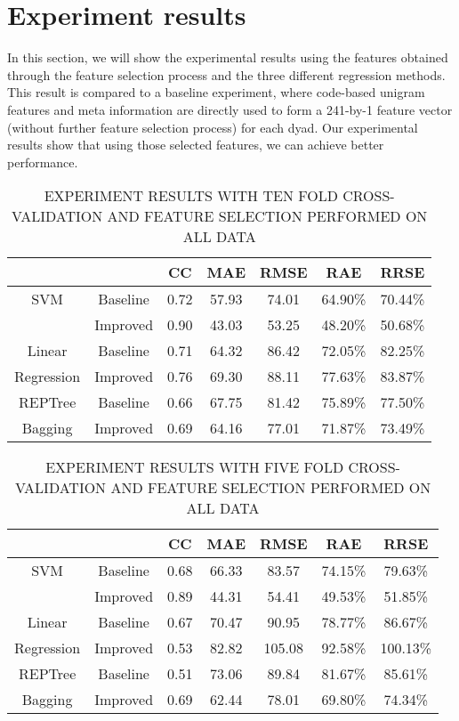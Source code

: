 \documentclass[11pt]{article} %
\begin{document}
\section{Experiment results}
In this section, we will show the experimental results using the features obtained through the feature selection process and the three different regression methods. This result is compared to a baseline experiment, where code-based unigram features and meta information are directly used to form a 241-by-1 feature vector (without further feature selection process) for each dyad. Our experimental results show that using those selected features, we can achieve better performance. 
\begin{table}
  \centering
  \caption{EXPERIMENT RESULTS WITH TEN FOLD CROSS-VALIDATION AND FEATURE SELECTION PERFORMED ON ALL DATA}
  \begin{tabular}{|c|c|c|c|c|c|c|}
     \hline
         &       & CC & MAE & RMSE & RAE & RRSE\\
     \hline
     SVM & Baseline & 0.72  & 57.93  & 74.01  & 64.90\%  & 70.44\%\\
         & Improved & 0.90  & 43.03  & 53.25  & 48.20\%  & 50.68\%\\
     \hline
  Linear & Baseline &  0.71 & 64.32  & 86.42  & 72.05\% & 82.25\%\\
  Regression & Improved & 0.76  & 69.30  & 88.11  & 77.63\%  & 83.87\%  \\
  \hline
  REPTree & Baseline &  0.66 & 67.75  & 81.42  & 75.89\%  & 77.50\%\\
  Bagging & Improved &  0.69 & 64.16  & 77.01  & 71.87\%  & 73.49\%\\
  \hline
  \end{tabular}\label{tab:result1}
\end{table}

\begin{table}
  \centering
  \caption{EXPERIMENT RESULTS WITH FIVE FOLD CROSS-VALIDATION AND FEATURE SELECTION PERFORMED ON ALL DATA}
  \begin{tabular}{|c|c|c|c|c|c|c|}
     \hline
         &       & CC & MAE & RMSE & RAE & RRSE\\
     \hline
     SVM & Baseline & 0.68  & 66.33  & 83.57  & 74.15\%  & 79.63\%\\
         & Improved & 0.89  & 44.31  & 54.41  & 49.53\%  & 51.85\%\\
     \hline
  Linear & Baseline &  0.67 & 70.47  & 90.95  & 78.77\% & 86.67\%\\
  Regression & Improved & 0.53 & 82.82 & 105.08  & 92.58\%  & 100.13\%  \\
  \hline
  REPTree & Baseline &  0.51 & 73.06  & 89.84  & 81.67\%  & 85.61\%\\
  Bagging & Improved &  0.69 & 62.44  & 78.01  & 69.80\%  & 74.34\%\\
  \hline
  \end{tabular}\label{tab:result1}
\end{table}
\end{document}
